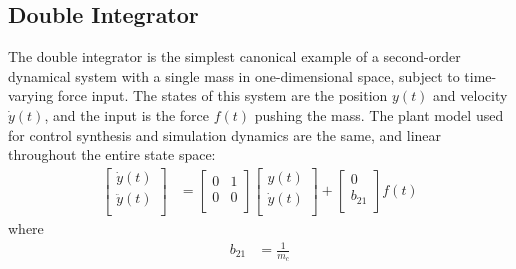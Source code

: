 \subsection{Double Integrator}
The double integrator is the simplest canonical example of a second-order dynamical system with a single mass in one-dimensional space, subject to time-varying force input.  The states of this system are the position $y(t)$ and velocity $\dot{y}(t)$, and the input is the force $f(t)$ pushing the mass.  The plant model used for control synthesis and simulation dynamics are the same, and linear throughout the entire state space:
\begin{equation}
\begin{aligned}
	\begin{bmatrix}
		\dot{y}(t)\\
		\ddot{y}(t)\\
	\end{bmatrix}
	&=
	\begin{bmatrix}
		0 & 1\\
		0 & 0\\
	\end{bmatrix}
	\begin{bmatrix}
		y(t)\\
		\dot{y}(t)\\
	\end{bmatrix}
	+
	\begin{bmatrix}
		0\\
		b_{21}\\
	\end{bmatrix}
	f(t)
\end{aligned}
\end{equation}
where
\begin{equation}
\begin{aligned}
	b_{21} &= \frac{1}{m_{c}}
\end{aligned}
\end{equation}

